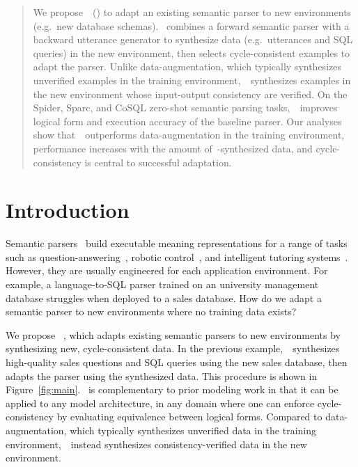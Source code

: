\documentclass[11pt,a4paper]{article}
\newcommand{\setttsize}[1]{\def\ttsize{#1}}
\begin{document}
\newcommand{\policy}{{\bm y}_{{\rm policy}}}
\newcommand{\baseline}{y_{\rm baseline}}


\newcommand{\selfattn}{{\rm selfattn}}
\newcommand{\BiLSTM}{{\rm BiLSTM}}
\newcommand{\mlp}{{\rm MLP}}
\newcommand{\conv}{{\rm Conv}}
\newcommand{\relu}{{\rm ReLU}}
\newcommand{\maxpool}{{\rm MaxPool}}
\newcommand{\attend}[2]{{\rm attend}({{#1}}, {{#2}})}
%
\clearpage{}
\setttsize{\small}

\maketitle
\begin{abstract}
We propose~\papertitle~(\modelnameshort) to adapt an existing semantic parser to new environments (e.g.~new database schemas). 
\modelnameshort~combines a forward semantic parser with a backward utterance generator to synthesize data (e.g.~utterances and SQL queries) in the new environment, then selects cycle-consistent examples to adapt the parser.
Unlike data-augmentation, which typically synthesizes unverified examples in the training environment,~\modelnameshort~synthesizes examples in the new environment whose input-output consistency are verified.
On the Spider, Sparc, and CoSQL zero-shot semantic parsing tasks,~\modelnameshort~improves logical form and execution accuracy of the baseline parser.
Our analyses show that~\modelnameshort~outperforms data-augmentation in the training environment, performance increases with the amount of~\modelnameshort-synthesized data, and cycle-consistency is central to successful adaptation.
\end{abstract}

\section{Introduction}

Semantic parsers~\citep{zelle1996LearningTP,zettlemoyer2005LearningTM,Liang2011LearningDC} build executable meaning representations for a range of tasks such as question-answering~\citep{yih2014semantic}, robotic control~\citep{matuszek2013Learning}, and intelligent tutoring systems~\citep{graesser2005autotutor}.
However, they are usually engineered for each application environment.
For example, a language-to-SQL parser trained on an university management database struggles when deployed to a sales database.
How do we adapt a semantic parser to new environments where no training data exists?

We propose~\modelnameemphasized
, which adapts existing semantic parsers to new environments by synthesizing new, cycle-consistent data.
In the previous example,~\modelnameshort~synthesizes high-quality sales questions and SQL queries using the new sales database, then adapts the parser using the synthesized data.
This procedure is shown in Figure~\ref{fig:main}.
\modelnameshort~is complementary to prior modeling work in that it can be applied to any model architecture, in any domain where one can enforce cycle-consistency by evaluating equivalence between logical forms.
Compared to data-augmentation, which typically synthesizes unverified data in the training environment,~\modelnameshort~instead synthesizes consistency-verified data in the new environment.
\end{document}

